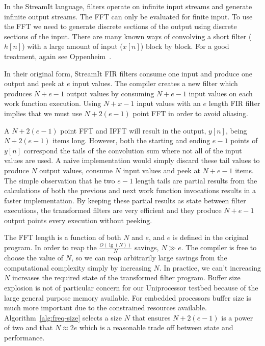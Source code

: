 In the StreamIt language, filters operate on infinite input streams 
and generate infinite output streams.
The FFT can only be evaluated for finite input. To use the FFT we need to
generate discrete sections of the output using discrete sections of the input.
There are many known ways of convolving a short filter ($h[n]$) with
a large amount of input ($x[n]$) block by block.
For a good treatment, again see Oppenheim~\cite{oppenheim-discrete}. 

In their original form, StreamIt FIR filters consume one input and 
produce one output and peek at $e$ input values. The compiler creates 
a new filter which produces $N+e-1$ output values by consuming $N+e-1$ input 
values on each work function execution. 
Using $N+x-1$ input values with an $e$ length FIR filter implies that we
must use $N+2(e-1)$ point FFT in order to avoid aliasing.

A $N+2(e-1)$ point FFT and IFFT will result in the output, $y[n]$, being $N+2(e-1)$
items long. However, both the starting and ending $e-1$ points of $y[n]$ correspond
the tails of the convolution sum where not all of the input values are used. 
A naive implementation would simply discard these tail values to produce 
$N$ output values, consume $N$ input values and peek at $N+e-1$ items.
The simple observation that he two $e-1$ length tails are partial results from the 
calculations of both the previous and next work function invocations results in 
a faster implementation. By keeping these partial results as state between
filter executions, the transformed filters are very efficient and they 
produce $N+e-1$ output points every execution without peeking.

The FFT length is a function of both $N$ and $e$, and $e$ is defined in the
original program. In order to reap the $\frac{O(\lg(N))}{N}$ savings, 
$N \gg e$. The compiler is free to choose the value of $N$, 
so we can reap arbitrarily large savings from the computational complexity 
simply by increasing $N$. 
In practice, we can't increasing $N$ increases the required state
of the transformed filter program. Buffer size explosion is
not of particular concern for our Uniprocessor testbed because of the large
general purpose memory available. For embedded processors 
buffer size is much more important due to the constrained resources available.
Algorithm~\ref{alg:freq-size} selects a size $N$ that ensures 
$N+2(e-1)$ is a power of two and that $N \approx 2e$ which is a 
reasonable trade off between state and performance.


